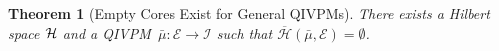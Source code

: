 \documentclass[english,reprint, aps, prl,superscriptaddress, showpacs,
showkeys, longbibliography, amsmath, amssymb, floatfix]{revtex4-1}
\theoremstyle{plain}
\newtheorem{thm}{Theorem}
\theoremstyle{definition}
\newcommand{\Hilb}{\mathcal{H}}
\newcommand{\events}{\ensuremath{\mathcal{E}}}
\newcommand{\coreBorn}{\ensuremath{\overline{\Hilb}}}
\begin{document}

\begin{thm}[Empty Cores Exist for General
  QIVPMs]\label{thm:Non-extensible-of-Gleason's}There exists a Hilbert
  space  ${\cal H}$ and a QIVPM~$\bar{\mu}:\events\rightarrow\mathscr{I}$ such
  that $\coreBorn\left(\bar{\mu},\events\right)=\emptyset$.\end{thm}
\end{document}
